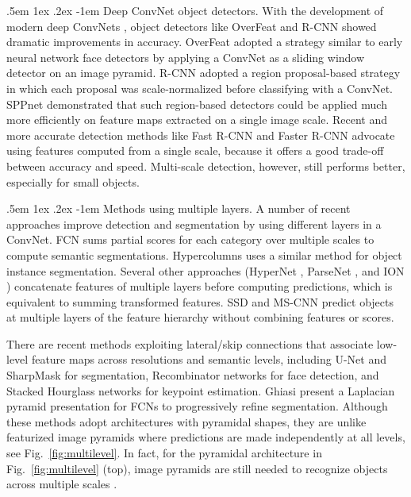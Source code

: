 \documentclass[10pt,twocolumn,letterpaper]{article}
\makeatletter
\renewcommand\paragraph{\@startsection{paragraph}{4}{\z@}%
  {.5em \@plus1ex \@minus.2ex}%
  {-1em}%
  {\normalfont\normalsize\bfseries}}
\makeatother
\begin{document}
\paragraph{Deep ConvNet object detectors.}
With the development of modern deep ConvNets \cite{Krizhevsky2012}, object detectors like OverFeat \cite{Sermanet2014} and R-CNN \cite{Girshick2014} showed dramatic improvements in accuracy.
OverFeat adopted a strategy similar to early neural network face detectors by applying a ConvNet as a sliding window detector on an image pyramid.
R-CNN adopted a region proposal-based strategy \cite{Uijlings2013} in which each proposal was scale-normalized before classifying with a ConvNet.
SPPnet \cite{He2014} demonstrated that such region-based detectors could be applied much more efficiently on feature maps extracted on a single image scale.
Recent and more accurate detection methods like Fast R-CNN \cite{Girshick2015a} and Faster R-CNN \cite{Ren2015a} advocate using features computed from a single scale, because it offers a good trade-off between accuracy and speed.
Multi-scale detection, however, still performs better, especially for small objects.

\paragraph{Methods using multiple layers.}
A number of recent approaches improve detection and segmentation by using different layers in a ConvNet.
FCN \cite{Long2015} sums partial scores for each category over multiple scales to compute semantic segmentations.
Hypercolumns \cite{Hariharan2015} uses a similar method for object instance segmentation.
Several other approaches (HyperNet \cite{Kong2016}, ParseNet \cite{Liu2015}, and ION \cite{Bell2016}) concatenate features of multiple layers before computing predictions, which is equivalent to summing transformed features.
SSD \cite{Liu2016} and MS-CNN \cite{Cai2016} predict objects at multiple layers of the feature hierarchy without combining features or scores.

There are recent methods exploiting lateral/skip connections that associate low-level feature maps across resolutions and semantic levels, including U-Net \cite{ronneberger2015} and SharpMask \cite{Pinheiro2016} for segmentation, Recombinator networks \cite{Honari2016} for face detection, and Stacked Hourglass networks \cite{Newell2016} for keypoint estimation.
Ghiasi \etal \cite{Ghiasi2016} present a Laplacian pyramid presentation for FCNs to progressively refine segmentation.
Although these methods adopt architectures with pyramidal shapes, they are unlike featurized image pyramids \cite{Dalal2005,Felzenszwalb2010,Sermanet2014} where predictions are made independently at all levels, see Fig.~\ref{fig:multilevel}. In fact, for the pyramidal architecture in Fig.~\ref{fig:multilevel} (top), image pyramids are still needed to recognize objects across multiple scales \cite{Pinheiro2016}.
\end{document}
